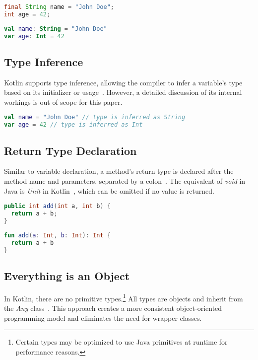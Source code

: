 \documentclass[a4paper,11pt]{article}
\begin{document}
\begin{lstlisting}[language=Java, title={Java data types}]
final String name = "John Doe";
int age = 42;
\end{lstlisting}

\begin{lstlisting}[language=Kotlin, title={Kotlin data types}]
val name: String = "John Doe"
var age: Int = 42
\end{lstlisting}

\subsection{Type Inference}
Kotlin supports type inference, allowing the compiler to infer a variable's type based on its initializer or usage~\cite{type-inference}. However, a detailed discussion of its internal workings is out of scope for this paper.

\begin{lstlisting}[language=Kotlin]
val name = "John Doe" // type is inferred as String
var age = 42 // type is inferred as Int
\end{lstlisting}

\subsection{Return Type Declaration}
Similar to variable declaration, a method's return type is declared after the method name and parameters, separated by a colon~\cite{functions}. The equivalent of \textit{void} in Java is \textit{Unit} in Kotlin~\cite{builtin-types-unit,kotlin-stdlib-unit}, which can be omitted if no value is returned.

\begin{lstlisting}[language=Java, title={Java method declaration}]
public int add(int a, int b) {
  return a + b;
}
\end{lstlisting}

\begin{lstlisting}[language=Kotlin, title={Kotlin method declaration}]
fun add(a: Int, b: Int): Int {
  return a + b
}
\end{lstlisting}

\subsection{Everything is an Object}
In Kotlin, there are no primitive types.\footnote{Certain types may be optimized to use Java primitives at runtime for performance reasons.} All types are objects and inherit from the \textit{Any} class~\cite{basic-types}. This approach creates a more consistent object-oriented programming model and eliminates the need for wrapper classes.
\end{document}

